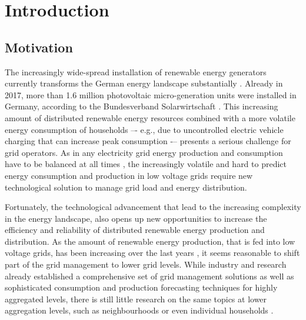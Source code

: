
\section{Introduction}\label{Sec:Intro}




\subsection{Motivation}\label{Sec:Intro;Subsec:Motivation}

The increasingly wide-spread installation of renewable energy generators currently transforms the German energy landscape substantially \citep{Bayer:2018}. Already in 2017, more than 1.6 million photovoltaic micro-generation units were installed in Germany, according to the Bundesverband Solarwirtschaft \citep{BSW-Solar:2018}. This increasing amount of distributed renewable energy resources combined with a more volatile energy consumption of households –- e.g., due to uncontrolled electric vehicle charging that can increase peak consumption \citep{Fitzgerald:2016,Floch:2017} -– presents a serious challenge for grid operators. As in any electricity grid energy production and consumption have to be balanced at all times \citep{Weron:2006}, the increasingly volatile and hard to predict energy consumption and production in low voltage grids require new technological solution to manage grid load and energy distribution.

Fortunately, the technological advancement that lead to the increasing complexity in the energy landscape, also opens up new opportunities to increase the efficiency and reliability of distributed renewable energy production and distribution. As the amount of renewable energy production, that is fed into low voltage grids, has been increasing over the last years \citep{Bayer:2018}, it seems reasonable to shift part of the grid management to lower grid levels. While industry and research already established a comprehensive set of grid management solutions as well as sophisticated consumption and production forecasting techniques for highly aggregated levels, there is still little research on the same topics at lower aggregation levels, such as neighbourhoods or even individual households \citep{Meer:2018}.

